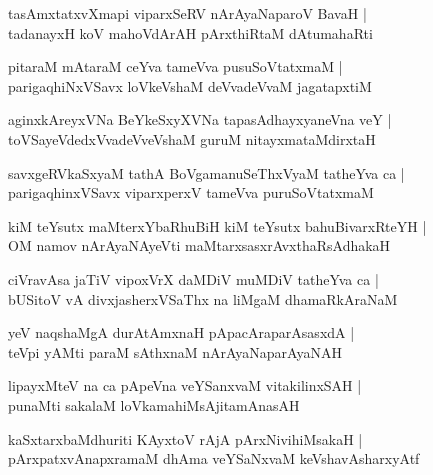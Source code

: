 \documentclass[twoside,12pt,openright]{book}
\newcounter{shloka}[chapter]
\begin{document}
\begin{shloka}%
tasAmxtatxvXmapi viparxSeRV nArAyaNaparoV BavaH |\\
tadanayxH koV mahoVdArAH pArxthiRtaM dAtumahaRti 
\end{shloka}

\begin{shloka}%
pitaraM mAtaraM ceYva tameVva pusuSoVtatxmaM |\\
parigaqhiNxVSavx loVkeVshaM deVvadeVvaM jagatapxtiM 
\end{shloka}

\begin{shloka}%
aginxkAreyxVNa BeYkeSxyXVNa tapasAdhayxyaneVna veY |\\
toVSayeVdedxVvadeVveVshaM guruM nitayxmataMdirxtaH 
\end{shloka}

\begin{shloka}%
savxgeRVkaSxyaM tathA BoVgamanuSeThxVyaM tatheYva ca |\\
parigaqhinxVSavx viparxperxV tameVva puruSoVtatxmaM 
\end{shloka}

\begin{shloka}%
kiM teYsutx maMterxYbaRhuBiH kiM teYsutx bahuBivarxRteYH |\\
OM namov nArAyaNAyeVti maMtarxsasxrAvxthaRsAdhakaH 
\end{shloka}

\begin{shloka}%
ciVravAsa jaTiV vipoxVrX daMDiV muMDiV tatheYva ca |\\
bUSitoV vA divxjasherxVSaThx na liMgaM dhamaRkAraNaM 
\end{shloka}

\begin{shloka}%
yeV naqshaMgA durAtAmxnaH pApacAraparAsasxdA |\\
teVpi yAMti paraM sAthxnaM nArAyaNaparAyaNAH 
\end{shloka}

\begin{shloka}%
lipayxMteV na ca pApeVna veYSanxvaM vitakilinxSAH |\\
punaMti sakalaM loVkamahiMsAjitamAnasAH 
\end{shloka}

\begin{shloka}%
kaSxtarxbaMdhuriti KAyxtoV rAjA pArxNivihiMsakaH |\\
pArxpatxvAnapxramaM dhAma veYSaNxvaM keVshavAsharxyAtf 
\end{shloka}
\end{document}
